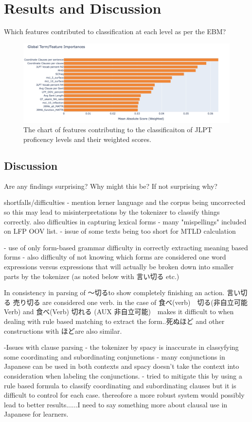 \chapter{Results and Discussion}
Which features contributed to classification at each level as per the EBM?

\begin{figure}[h!]
    \centering
    \includegraphics[scale=.5]{img/feature_importance}
    \caption{The chart of features contributing to the classificaiton of JLPT proficency levels and their weighted scores. }
    \label{fig:featureimportance}
\end{figure}

\section{Discussion}
Are any findings surprising? Why might this be? If not surprising why?


shortfalls/difficulties
- mention lerner language and the corpus being uncorrected so this may lead to misinterpretations by the tokenizer to classify things correctly.
    also difficulties in capturing lexical forms - many "mispellings" included on LFP OOV list.
- issue of some texts being too short for MTLD calculation

- use of only form-based grammar difficulty in correctly extracting meaning based forms
- also difficulty of not knowing which forms are considered one word expressions versus expressions that will
actually be broken down into smaller parts by the tokenizer (as noted below with 言い切る etc.)

In consistency in parsing of 〜切るto show completely finishing an action. 言い切る 売り切る are considered one verb. in the
case of 食べ(verb)　切る(非自立可能Verb) and 食べ(Verb) 切れる (AUX 非自立可能)　makes it difficult to when dealing with rule based
matching to extract the form..死ぬほど and other constructions with ほどare also similar.

-Issues with clause parsing - the tokenizer by spacy is inaccurate in classyfying some coordinating and
subordinating conjunctions - many conjunctions in Japanese can be used in both contexts and spacy doesn't take the
context into consideration when labeling the conjunctions. - tried to mitigate this by using a rule based formula to
classify coordinating and subordinating clauses but it is difficult to control for each case. thereofore a more
robust system would possibly lead to better results......I need to say something more about clausal use in Japanese
for learners.


